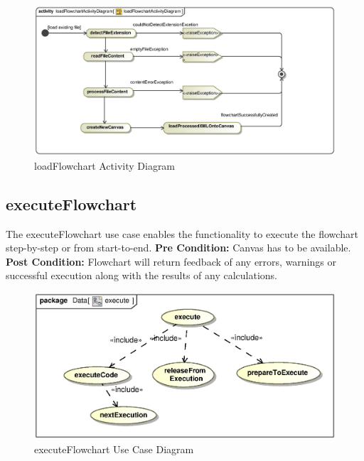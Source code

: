 \documentclass[11pt,a4paper,titlepage]{article}
\begin{document}
\begin{figure}[H]
  \centering
\includegraphics[width=500px]{loadFlowchartActivityDiagram.eps}
\caption{loadFlowchart Activity Diagram}
\end{figure}



\newpage
\subsection{executeFlowchart}
The executeFlowchart use case enables the functionality to execute the flowchart step-by-step or from start-to-end.\newline\newline
\textbf{Pre Condition:} Canvas has to be available.\newline\newline
\textbf{Post Condition:} Flowchart will return feedback of any errors, warnings or successful execution along with the results of any calculations.

\begin{figure}[H]
  \centering
\includegraphics[width=500px]{execute.eps}
\caption{executeFlowchart Use Case Diagram}
\end{figure}
\end{document}
